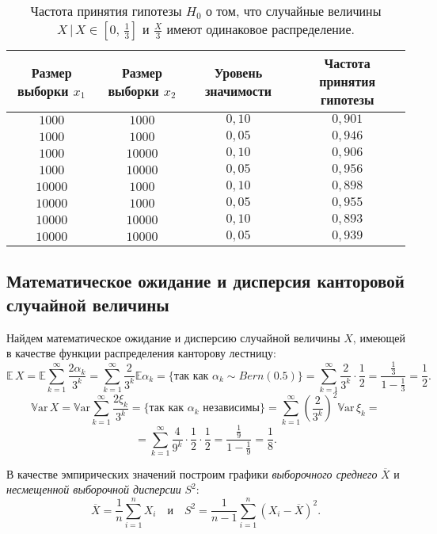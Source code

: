 \documentclass[a4paper, 11pt]{article}
\theoremstyle{def}
\theoremstyle{th}
\theoremstyle{rem}
\newcommand{\E}{\mathbb{E}}
\newcommand{\Var}{\mathbb{V}\mbox{ar}}
\begin{document}
\begin{table}[H]
\begin{center}
\begin{tabular}{|c|c|c|c|}
\hline
Размер выборки $x_1$ &
Размер выборки $x_2$ &
Уровень значимости &
Частота принятия гипотезы
\\
\hline
$1000$
&
$1000$
&
$0,10$
&
$0,901$
\\
\hline
$1000$
&
$1000$
&
$0,05$
&
$0,946$
\\
\hline
$1000$
&
$10000$
&
$0,10$
&
$0,906$
\\
\hline
$1000$
&
$10000$
&
$0,05$
&
$0,956$
\\
\hline
$10000$
&
$1000$
&
$0,10$
&
$0,898$
\\
\hline
$10000$
&
$1000$
&
$0,05$
&
$0,955$
\\
\hline
$10000$
&
$10000$
&
$0,10$
&
$0,893$
\\
\hline
$10000$
&
$10000$
&
$0,05$
&
$0,939$
\\
\hline
\end{tabular}
\end{center}
\caption{Частота принятия гипотезы $H_0$ о том, что случайные величины $X\,|\,X\in[0,\,\frac{1}{3}]$ и $\frac{X}{3}$ имеют одинаковое распределение.}
\end{table}

\subsection{Математическое ожидание и дисперсия канторовой случайной величины}

Найдем математическое ожидание и дисперсию случайной величины $X$, имеющей в качестве функции распределения канторову лестницу:
$$
        \E\,X
        =
        \E\sum_{k=1}^{\infty}\frac{2\alpha_k}{3^k}
        =
        \sum_{k=1}^{\infty}\frac{2}{3^k}\E\alpha_k=
        \{\text{так как }\alpha_k \sim Bern(0.5)\} =
        \sum_{k=1}^\infty \frac{2}{3^k}\cdot\frac12
        =
        \frac{\frac13}{1 - \frac13}
        =
        \frac{1}{2}.
$$
$$
        \Var\,X
        =
        \Var\sum_{k=1}^{\infty}\frac{2\xi_k}{3^k}
        = \{\text{так как }\alpha_k \text{ независимы}\} =
        \sum_{k=1}^{\infty}\left(\frac{2}{3^k}\right)^2\Var\,\xi_k
        =
$$
$$
        =\sum_{k=1}^{\infty}\frac{4}{9^k}\cdot\frac12 \cdot\frac{1}{2}
        =
        \frac{\frac19}{1 - \frac19}
        =
        \frac18.
$$

В качестве эмпирических значений построим графики \textit{выборочного среднего} $\overline{X}$ и \textit{несмещенной выборочной дисперсии} $S^2$:
$$
        \overline{X} = \frac{1}{n}\sum_{i=1}^n X_i
        \quad
        \mbox{и}
        \quad
        S^2 = \frac{1}{n-1}\sum_{i=1}^n(X_i - \overline{X})^2.
$$
\end{document}
